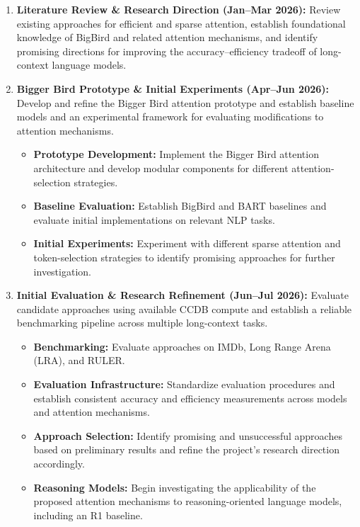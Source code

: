 \documentclass{article}
\begin{document}
\begin{enumerate}


\item \textbf{Literature Review \& Research Direction (Jan--Mar 2026):} Review existing approaches for efficient and sparse attention, establish foundational knowledge of BigBird and related attention mechanisms, and identify promising directions for improving the accuracy--efficiency tradeoff of long-context language models.

\item \textbf{Bigger Bird Prototype \& Initial Experiments (Apr--Jun 2026):} Develop and refine the Bigger Bird attention prototype and establish baseline models and an experimental framework for evaluating modifications to attention mechanisms.

\begin{itemize}
    \item \textbf{Prototype Development:} Implement the Bigger Bird attention architecture and develop modular components for different attention-selection strategies.
    \item \textbf{Baseline Evaluation:} Establish BigBird and BART baselines and evaluate initial implementations on relevant NLP tasks.
    \item \textbf{Initial Experiments:} Experiment with different sparse attention and token-selection strategies to identify promising approaches for further investigation.
\end{itemize}

\item \textbf{Initial Evaluation \& Research Refinement (Jun--Jul 2026):} Evaluate candidate approaches using available CCDB compute and establish a reliable benchmarking pipeline across multiple long-context tasks.

\begin{itemize}
    \item \textbf{Benchmarking:} Evaluate approaches on IMDb, Long Range Arena (LRA), and RULER.
    \item \textbf{Evaluation Infrastructure:} Standardize evaluation procedures and establish consistent accuracy and efficiency measurements across models and attention mechanisms.
    \item \textbf{Approach Selection:} Identify promising and unsuccessful approaches based on preliminary results and refine the project's research direction accordingly.
    \item \textbf{Reasoning Models:} Begin investigating the applicability of the proposed attention mechanisms to reasoning-oriented language models, including an R1 baseline.
\end{itemize}


\end{enumerate}
\end{document}
